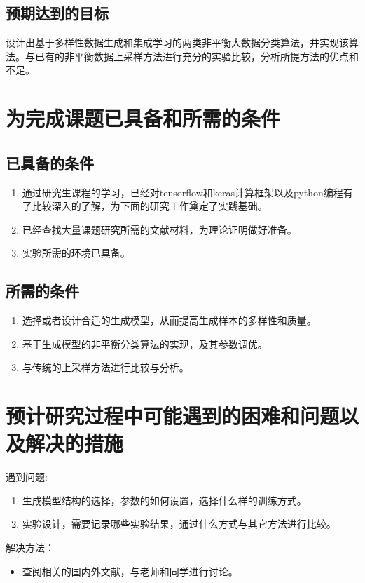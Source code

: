 \documentclass{article}
\begin{document}
\subsection{预期达到的目标}
设计出基于多样性数据生成和集成学习的两类非平衡大数据分类算法，并实现该算法。与已有的非平衡数据上采样方法进行充分的实验比较，分析所提方法的优点和不足。

\section{为完成课题已具备和所需的条件}
\subsection{已具备的条件}
\begin{enumerate}
    \item 
    通过研究生课程的学习，已经对tensorflow和keras计算框架以及python编程有了比较深入的了解，为下面的研究工作奠定了实践基础。
    \item 
    已经查找大量课题研究所需的文献材料，为理论证明做好准备。
    \item 
    实验所需的环境已具备。
\end{enumerate}

\subsection{所需的条件}
\begin{enumerate}
    \item 
    选择或者设计合适的生成模型，从而提高生成样本的多样性和质量。
    \item 
    基于生成模型的非平衡分类算法的实现，及其参数调优。
    \item 
    与传统的上采样方法进行比较与分析。
\end{enumerate}

\section{预计研究过程中可能遇到的困难和问题以及解决的措施}
遇到问题:
\begin{enumerate}[itemindent=3em] 
    \item 生成模型结构的选择，参数的如何设置，选择什么样的训练方式。
    \item 实验设计，需要记录哪些实验结果，通过什么方式与其它方法进行比较。
\end{enumerate}
\par
解决方法：
\begin{itemize}[itemindent=3em] 
    \item 查阅相关的国内外文献，与老师和同学进行讨论。
\end{itemize}







\end{document}

